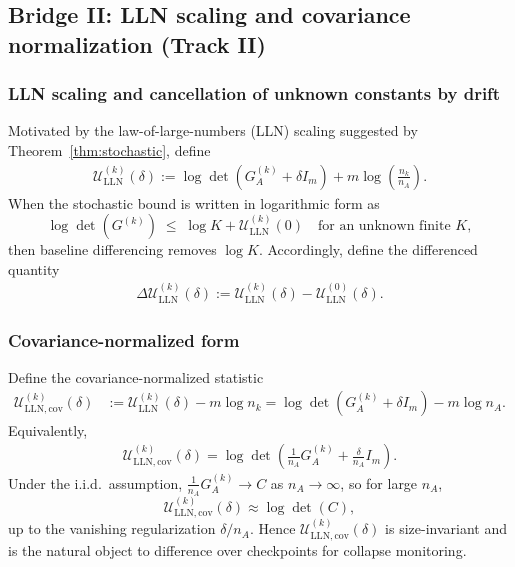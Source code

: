 \documentclass{article}
\theoremstyle{plain}
\theoremstyle{definition}
\theoremstyle{remark}
\begin{document}
\subsection{Bridge II: LLN scaling and covariance normalization (Track II)}
\label{app:sigmaub:bridgeII}

\subsubsection{LLN scaling and cancellation of unknown constants by drift}
Motivated by the law-of-large-numbers (LLN) scaling suggested by Theorem~\ref{thm:stochastic}, define
\begin{align}
\mathcal{U}_{\mathrm{LLN}}^{(k)}(\delta)
:= \log\det(G_A^{(k)}+\delta I_m) + m\log\!\left(\frac{n_k}{n_A}\right).
\label{eq:app:ulln_def}
\end{align}
When the stochastic bound is written in logarithmic form as
\[
\log\det(G^{(k)}) \;\le\; \log K + \mathcal{U}_{\mathrm{LLN}}^{(k)}(0)
\quad \text{for an unknown finite }K,
\]
then baseline differencing removes $\log K$. Accordingly, define the differenced quantity
\begin{align}
\Delta \mathcal{U}_{\mathrm{LLN}}^{(k)}(\delta)
:= \mathcal{U}_{\mathrm{LLN}}^{(k)}(\delta)-\mathcal{U}_{\mathrm{LLN}}^{(0)}(\delta).
\label{eq:app:ulln_drift}
\end{align}

\subsubsection{Covariance-normalized form}
Define the covariance-normalized statistic
\begin{align}
\mathcal{U}_{\mathrm{LLN,cov}}^{(k)}(\delta)
&:= \mathcal{U}_{\mathrm{LLN}}^{(k)}(\delta)-m\log n_k
= \log\det(G_A^{(k)}+\delta I_m) - m\log n_A.
\label{eq:app:ulln_cov_def}
\end{align}
Equivalently, 
\begin{align}
\mathcal{U}_{\mathrm{LLN,cov}}^{(k)}(\delta)
=
\log\det\!\left(\frac{1}{n_A}G_A^{(k)}+\frac{\delta}{n_A} I_m\right).
\label{eq:app:ulln_cov_scaled}
\end{align}
Under the i.i.d.\ assumption, $\frac{1}{n_A}G_A^{(k)}\to C$ as $n_A\to\infty$, so for large $n_A$,
\[
\mathcal{U}_{\mathrm{LLN,cov}}^{(k)}(\delta)\approx \log\det(C),
\]
up to the vanishing regularization $\delta/n_A$. Hence $\mathcal{U}_{\mathrm{LLN,cov}}^{(k)}(\delta)$ is
size-invariant and is the natural object to difference over checkpoints for collapse monitoring.
\end{document}

